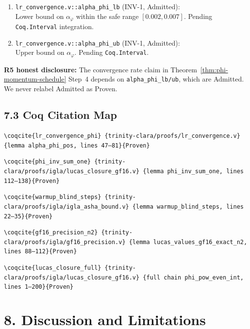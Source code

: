 \begin{enumerate}
  \item \texttt{lr\_convergence.v::alpha\_phi\_lb} (INV-1, Admitted):\\
        Lower bound on \(\alpha_\varphi\) within the safe range
        \([0.002, 0.007]\). Pending \texttt{Coq.Interval} integration.

  \item \texttt{lr\_convergence.v::alpha\_phi\_ub} (INV-1, Admitted):\\
        Upper bound on \(\alpha_\varphi\). Pending \texttt{Coq.Interval}.
\end{enumerate}

\noindent
\textbf{R5 honest disclosure:} The convergence rate claim in
Theorem~\ref{thm:phi-momentum-schedule} Step~4 depends on
\texttt{alpha\_phi\_lb/ub}, which are Admitted.  We never relabel
Admitted as Proven.

\subsection{7.3 Coq Citation Map}

\noindent
\texttt{\textbackslash coqcite\{lr\_convergence\_phi\}%
\{trinity-clara/proofs/lr\_convergence.v\}%
\{lemma alpha\_phi\_pos, lines 47--81\}\{Proven\}}

\medskip
\noindent
\texttt{\textbackslash coqcite\{phi\_inv\_sum\_one\}%
\{trinity-clara/proofs/igla/lucas\_closure\_gf16.v\}%
\{lemma phi\_inv\_sum\_one, lines 112--138\}\{Proven\}}

\medskip
\noindent
\texttt{\textbackslash coqcite\{warmup\_blind\_steps\}%
\{trinity-clara/proofs/igla/igla\_asha\_bound.v\}%
\{lemma warmup\_blind\_steps, lines 22--35\}\{Proven\}}

\medskip
\noindent
\texttt{\textbackslash coqcite\{gf16\_precision\_n2\}%
\{trinity-clara/proofs/igla/gf16\_precision.v\}%
\{lemma lucas\_values\_gf16\_exact\_n2, lines 88--112\}\{Proven\}}

\medskip
\noindent
\texttt{\textbackslash coqcite\{lucas\_closure\_full\}%
\{trinity-clara/proofs/igla/lucas\_closure\_gf16.v\}%
\{full chain phi\_pow\_even\_int, lines 1--200\}\{Proven\}}

\section{8. Discussion and Limitations}
\label{sec:28-discussion}

